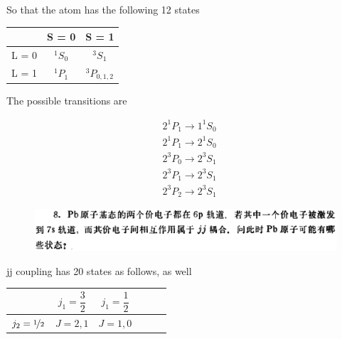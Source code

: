 \documentclass{article}
\renewcommand{\frac}{\nicefrac}
\begin{document}
So that the atom has the following 12 states

\begin{center}
\begin{tabular}{ c|cc } 
        & S = 0 & S = 1 \\
  \hline
  L = 0 & ${}^{1}S_{0}$ & ${}^{3}S_{1}$ \\
  L = 1 & ${}^{1}P_{1}$ & ${}^{3}P_{0,1,2}$ \\ 
\end{tabular}
\end{center}

The possible transitions are

\begin{equation*}
  \begin{aligned}
    & 2^1 P_1 \rightarrow 1^1 S_0 \\
    & 2^1 P_1 \rightarrow 2^1 S_0 \\
    & 2^3 P_0 \rightarrow 2^3 S_1 \\
    & 2^3 P_1 \rightarrow 2^3 S_1 \\
    & 2^3 P_2 \rightarrow 2^3 S_1
  \end{aligned}
\end{equation*}

\begin{figure}[H]
  \centering
  \includegraphics[width=\linewidth]{figures/Problem8}
  \label{fig:}
\end{figure}


jj coupling has 20 states as follows, as well

\begin{center}
\begin{tabular}{ Sc|Sc Sc } 
        & $j_1 = \dfrac{3}{2} $ & $j_1 = \dfrac{1}{2} $ \\
  \hline
  $j_2 = \frac{1}{2} $ & $J = 2,1$ & $J = 1,0$ \\ 
\end{tabular}
\end{center}
\end{document}
